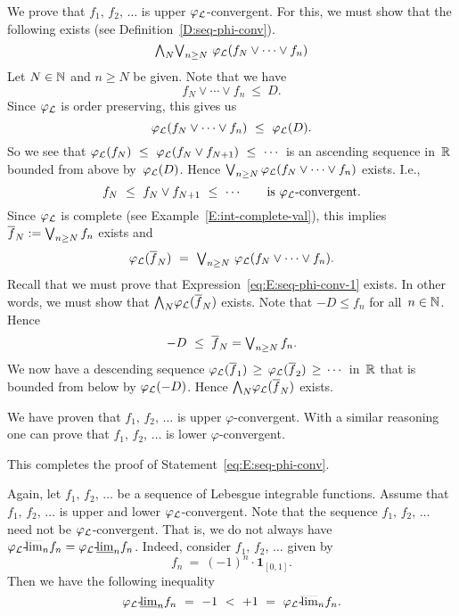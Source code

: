 \documentclass[main.tex]{subfiles}
\begin{document}
\begin{ex}
We prove that $f_1,\,f_2,\,\dotsc$
is upper $\varphi_{\mathcal{L}}$-convergent.
For this,
we must show that the following exists
(see Definition~\ref{D:seq-phi-conv}).
\begin{equation}
\label{eq:E:seq-phi-conv-1}
\textstyle{\bigwedge}_N \textstyle{\bigvee}_{n\geq N}\ \varphi_{\mathcal{L}}(f_N\vee\dotsb\vee f_n)
\end{equation}
Let $N\in\mathbb{N}$ and $n\geq N$ be given.
Note that we have 
\begin{equation*}
f_N \vee \dotsb\vee f_n \ \leq\ D.
\end{equation*}
Since $\varphi_{\mathcal{L}}$ is order preserving, this gives us
\begin{equation*}
\varphi_{\mathcal{L}}(f_N \vee \dotsb \vee f_n)
\ \leq\  \varphi_{\mathcal{L}}(D).
\end{equation*}
So we see that 
$\Lphi(f_N) \ \leq\ 
\Lphi(f_N \vee f_{N+1}) \ \leq\ \dotsb$
is an ascending sequence in~$\mathbb{R}$
bounded from above by~$\varphi_{\mathcal{L}}(D)$.
Hence $\textstyle{\bigvee}_{n\geq N} \, \varphi_{\mathcal{L}}(f_N\vee \dotsb \vee f_n)$ exists.
I.e.,
\begin{equation*}
f_N \ \leq \ f_N \vee f_{N+1} \ \leq\ \dotsb
\qquad\text{is $\varphi_{\mathcal{L}}$-convergent.}
\end{equation*}
Since $\varphi_{\mathcal{L}}$ is complete
(see Example~\ref{E:int-complete-val}),
this implies $\overline{f}_N := \textstyle{\bigvee}_{n\geq N}\,f_n$ exists and
\begin{equation*}
\Lphi(\ol{f}_N)\ 
=\ \bv_{n\geq N}\ \Lphi(f_N \vee \dotsb \vee f_n).
\end{equation*}
Recall that we must prove that Expression~\eqref{eq:E:seq-phi-conv-1}
exists.
In other words,
we must show that $\textstyle{\bigwedge}_N \varphi_{\mathcal{L}}(\overline{f}_N)$ exists.
Note that $-D \leq  f_n$ for all~$n\in\mathbb{N}$.
Hence 
\begin{equation*}
-D \ \leq \   \overline{f}_N  = \textstyle{\bigvee}_{n \geq N}\, f_n .
\end{equation*}
We now have a descending sequence
$\varphi_{\mathcal{L}}(\overline{f}_1) \,\geq\, \varphi_{\mathcal{L}}(\overline{f}_2) \,\geq\,\dotsb$
in~$\mathbb{R}$ that is bounded from below by $\varphi_{\mathcal{L}}(-D)$.
Hence $\textstyle{\bigwedge}_N \varphi_{\mathcal{L}}(\overline{f}_N)$ exists.

We have proven that $f_1,\,f_2,\,\dotsc$ 
is upper $\varphi$-convergent.
With a similar reasoning one can prove that
$f_1,\,f_2,\,\dotsc$
is lower $\varphi$-convergent.

This completes the proof of Statement~\eqref{eq:E:seq-phi-conv}.

\vspace{.3em}

Again, let $f_1,\,f_2,\,\dotsc$ be a sequence of
Lebesgue integrable functions.
Assume that $f_1,\,f_2,\,\dotsc$
is upper and lower $\varphi_{\mathcal{L}}$-convergent.
Note that the sequence $f_1,\,f_2,\,\dotsc$
need not be $\varphi_{\mathcal{L}}$-convergent.
That is,
we do not always have
 ${\varphi_{\mathcal{L}}}\text{-}\!\smash{\overline{\lim}_{n}} f_n = {\varphi_{\mathcal{L}}}\text{-}\!\smash{\underline{\lim}_{n}} f_n$.
Indeed, consider $f_1,\,f_2,\,\dotsc$
given by
\begin{equation*}
f_n \ =\  (-1)^{n}\cdot \mathbf{1}_{[0,1]}.
\end{equation*}
Then we have the following inequality
\begin{equation*}
\pllim\Lphi{n} f_n \ = \ -1 \ <\  +1 \ = \ 
\pulim\Lphi{n} f_n.
\end{equation*}


\end{ex}
\end{document}
